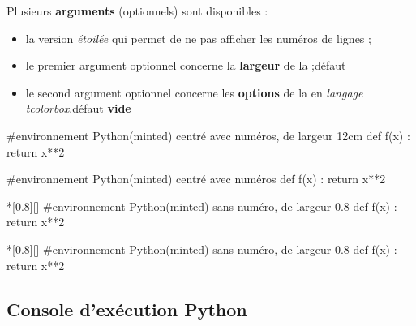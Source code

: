 \documentclass{article}
\newcommand\ctex[1]{\tcbox[vignettelatex]{#1}}
\newcommand\Cle[1]{{\bfseries\sffamily\textlangle #1\textrangle}}
\begin{document}
\begin{codecles}
Plusieurs \Cle{arguments} (optionnels) sont disponibles :

\begin{itemize}
	\item la version \textit{étoilée} qui permet de ne pas afficher les numéros de lignes ;
	\item le premier argument optionnel concerne la \Cle{largeur} de la \ctex{tcbox} ;\hfill{}défaut \Cle{12cm}
	\item le second argument optionnel concerne les \Cle{options} de la \ctex{tcbox} en \textit{langage tcolorbox}.\hfill{}défaut \Cle{vide}
\end{itemize}
\end{codecles}

\begin{codetex}
\begin{envcodepythonminted}[12cm][center]
	#environnement Python(minted) centré avec numéros, de largeur 12cm
	def f(x) :
		return x**2
\end{envcodepythonminted}
\end{codetex}

\begin{codesortie}
\begin{envcodepythonminted}[12cm][center]
	#environnement Python(minted) centré avec numéros
	def f(x) :
		return x**2
\end{envcodepythonminted}
\end{codesortie}

\begin{codetex}
\begin{envcodepythonminted}*[0.8\linewidth][]
	#environnement Python(minted) sans numéro, de largeur 0.8\linewidth
	def f(x) :
		return x**2
\end{envcodepythonminted}
\end{codetex}

\begin{codesortie}
\begin{envcodepythonminted}*[0.8\linewidth][]
	#environnement Python(minted) sans numéro, de largeur 0.8\linewidth
	def f(x) :
		return x**2
\end{envcodepythonminted}
\end{codesortie}

\subsection{Console d'exécution Python}
\end{document}
